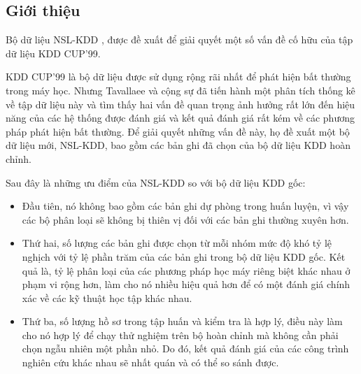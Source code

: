 \subsection{Giới thiệu}
Bộ dữ liệu NSL-KDD \cite{nslkdd}, được đề xuất để giải quyết một số vấn đề cố hữu của tập dữ liệu KDD CUP'99.
\par
KDD CUP’99 là bộ dữ liệu được sử dụng rộng rãi nhất để phát hiện bất thường trong máy học.
Nhưng Tavallaee và cộng sự đã tiến hành một phân tích thống kê về tập dữ liệu này và tìm thấy hai vấn đề quan trọng ảnh hưởng rất lớn đến hiệu năng của các hệ thống được đánh giá và kết quả đánh giá rất kém về các phương pháp phát hiện bất thường.
Để giải quyết những vấn đề này, họ đề xuất một bộ dữ liệu mới, NSL-KDD, bao gồm các bản ghi đã chọn của bộ dữ liệu KDD hoàn chỉnh.
\newline
\par
Sau đây là những ưu điểm của NSL-KDD so với bộ dữ liệu KDD gốc:
\par
\begin{itemize}
	\item Đầu tiên, nó không bao gồm các bản ghi dự phòng trong huấn luyện, vì vậy các bộ phân loại sẽ không bị thiên vị đối với các bản ghi thường xuyên hơn.
	\item Thứ hai, số lượng các bản ghi được chọn từ mỗi nhóm mức độ khó tỷ lệ nghịch với tỷ lệ phần trăm của các bản ghi trong bộ dữ liệu KDD gốc.
	      Kết quả là, tỷ lệ phân loại của các phương pháp học máy riêng biệt khác nhau ở phạm vi rộng hơn, làm cho nó nhiều hiệu quả hơn để có một đánh giá chính xác về các kỹ thuật học tập khác nhau.
	\item Thứ ba, số lượng hồ sơ trong tập huấn và kiểm tra là hợp lý, điều này làm cho nó hợp lý để chạy thử nghiệm trên bộ hoàn chỉnh mà không cần phải chọn ngẫu nhiên một phần nhỏ. Do đó, kết quả đánh giá của các công trình nghiên cứu khác nhau sẽ nhất quán và có thể so sánh được.
\end{itemize}
